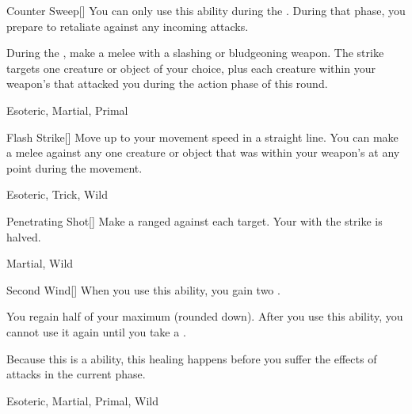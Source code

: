 \lowercase{\hypertarget{maneuver:Counter Sweep}{}}\label{maneuver:Counter Sweep}
\hypertarget{maneuver:Counter Sweep}{}
\begin{freeability}[Rank 4]{Counter Sweep}[]
You can only use this ability during the .
During that phase, you prepare to retaliate against any incoming attacks.

During the , make a melee  with a slashing or bludgeoning weapon.
The strike targets one creature or object of your choice,
plus each creature within your weapon's  that attacked you during the action phase of this round.


 Esoteric, Martial, Primal
\end{freeability}
\vspace{0.25em}



\lowercase{\hypertarget{maneuver:Flash Strike}{}}\label{maneuver:Flash Strike}
\hypertarget{maneuver:Flash Strike}{}
\begin{freeability}[Rank 4]{Flash Strike}[]
Move up to your movement speed in a straight line.
You can make a melee  against any one creature or object that was within your weapon's  at any point during the movement.


 Esoteric, Trick, Wild
\end{freeability}
\vspace{0.25em}



\lowercase{\hypertarget{maneuver:Penetrating Shot}{}}\label{maneuver:Penetrating Shot}
\hypertarget{maneuver:Penetrating Shot}{}
\begin{freeability}[Rank 4]{Penetrating Shot}[]
Make a ranged  against each target.
Your  with the strike is halved.


 Martial, Wild
\end{freeability}
\vspace{0.25em}



\lowercase{\hypertarget{maneuver:Second Wind}{}}\label{maneuver:Second Wind}
\hypertarget{maneuver:Second Wind}{}
\begin{freeability}[Rank 4]{Second Wind}[]
When you use this ability, you gain two .

You regain half of your maximum  (rounded down).
After you use this ability, you cannot use it again until you take a .

Because this is a  ability, this healing happens before you suffer the effects of attacks in the current phase.


 Esoteric, Martial, Primal, Wild
\end{freeability}
\vspace{0.25em}



